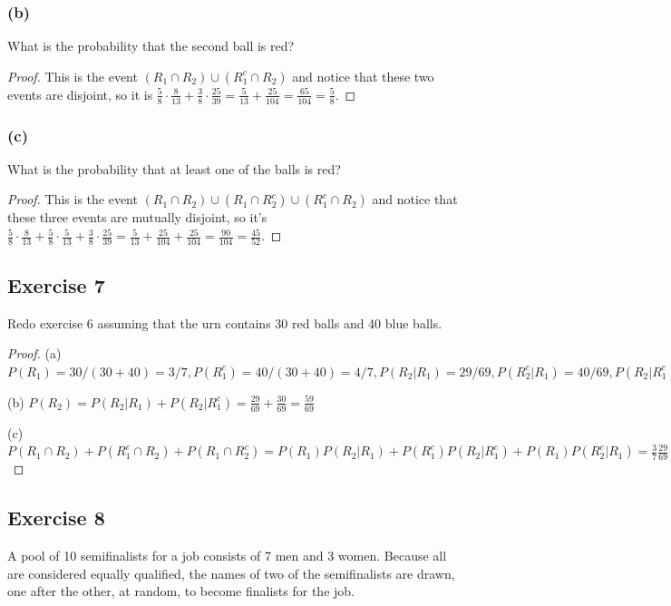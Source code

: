 \documentclass[14pt]{extarticle}
\begin{document}
\subsubsection{(b)}
What is the probability that the second ball is red?
\begin{proof}
This is the event \((R_1 \cap R_2) \cup (R_1^c \cap R_2)\) and notice that these two events are disjoint, so it is \(\frac{5}
{8} \cdot \frac{8}{13} + \frac{3}{8} \cdot \frac{25}{39} = \frac{5}{13} + \frac{25}{104} = \frac{65}{104}= \frac{5}{8}\).
\end{proof}

\subsubsection{(c)}
What is the probability that at least one of the balls is red?
\begin{proof}
This is the event \((R_1 \cap R_2) \cup (R_1 \cap R_2^c) \cup (R_1^c \cap R_2)\) and notice that these three events are 
mutually disjoint, so it's \(\frac{5}{8} \cdot \frac{8}{13} + \frac{5}{8}\cdot\frac{5}{13} + \frac{3}{8} \cdot \frac{25}{39}
= \frac{5}{13} + \frac{25}{104} + \frac{25}{104} = \frac{90}{104} = \frac{45}{52}\).
\end{proof}

\subsection{Exercise 7}
Redo exercise 6 assuming that the urn contains 30 red balls and 40 blue balls.

\begin{proof}
(a) \(P(R_1) = 30 / (30+40) = 3/7, P(R_1^c) = 40 / (30+40) = 4/7, P(R_2 | R_1) = 29/69, P(R_2^c | R_1) = 40/69, P(R_2 | 
R_1^c) = 30/69, P(R_2^c | R_1^c) = 39/69\)

(b) \(P(R_2) = P(R_2 | R_1) + P(R_2 | R_1^c) = \frac{29}{69} + \frac{30}{69} = \frac{59}{69}\)

(c) \(P(R_1 \cap R_2) + P(R_1^c \cap R_2) + P(R_1 \cap R_2^c) = P(R_1)P(R_2|R_1) + P(R_1^c)P(R_2|R_1^c) + P(R_1)P(R_2^c|R_1) 
= \frac{3}{7}\frac{29}{69} + \frac{4}{7}\frac{30}{69} + \frac{3}{7}\frac{40}{69} = \frac{3 \cdot 29 + 4 \cdot 30 + 
3 \cdot 40}{7 \cdot 69} = 327/483 = 0.677018634\)
\end{proof}

\subsection{Exercise 8}
A pool of 10 semifinalists for a job consists of 7 men and 3 women. Because all are considered equally qualified, the names 
of two of the semifinalists are drawn, one after the other, at random, to become finalists for the job.
\end{document}
